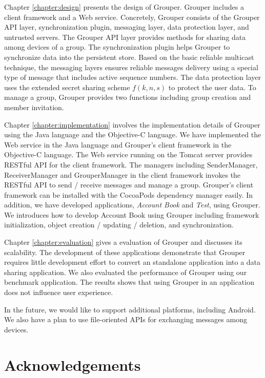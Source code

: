 \documentclass[a4paper,11pt]{report}
\begin{document}
Chapter \ref{chapter:design} presents the design of Grouper.
Grouper includes a client framework and a Web service.
Concretely, Grouper consists of the Grouper API layer, synchronization plugin, messaging layer, data protection layer, and untrusted servers.
The Grouper API layer provides methods for sharing data among devices of a group.
The synchronization plugin helps Grouper to synchronize data into the persistent store.
Based on the basic reliable multicast technique, the messaging layers ensures reliable messages delivery using a special type of message that includes active sequence numbers.
The data protection layer uses the extended secret sharing scheme $f(k ,n, s)$ to protect the user data.
To manage a group, Grouper provides two functions including group creation and member invitation.

Chapter \ref{chapter:implementation} involves the implementation details of Grouper using the Java language and the Objective-C language.
We have implemented the Web service in the Java language and Grouper's client framework in the Objective-C language.
The Web service running on the Tomcat server provides RESTful API for the client framework. 
The managers including SenderManager, ReceiverManager and GrouperManager in the client framework invokes the RESTful API to send / receive messages and manage a group.
Grouper's client framework can be installed with the CocoaPods dependency manager easily.
In addition, we have developed applications, \emph{Account Book} and \emph{Test}, using Grouper.
We introduces how to develop Account Book using Grouper including framework initialization, object creation / updating / deletion, and synchronization.

Chapter \ref{chapter:evaluation} gives a evaluation of Grouper and discusses its scalability.
The development of these applications demonstrate that Grouper requires little development effort to convert an standalone application into a data sharing application.
We also evaluated the performance of Grouper using our benchmark application.
The results shows that using Grouper in an application does not influence user experience.

In the future, we would like to support additional platforms, including Android.
We also have a plan to use file-oriented APIs for exchanging messages among devices.

\chapter*{Acknowledgements}
\end{document}
